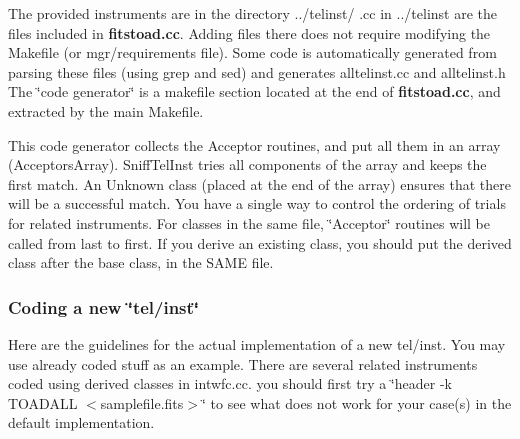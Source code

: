 The provided instruments are in the directory ../telinst/  .cc in ../telinst are the files included in {\bf fitstoad.cc}. Adding files there does not require modifying the Makefile (or mgr/requirements file). Some code is automatically generated from parsing these files (using grep and sed) and generates alltelinst.cc and alltelinst.h The \char`\"{}code generator\char`\"{} is a makefile section located at the end of {\bf fitstoad.cc}, and extracted by the main Makefile.

This code generator collects the Acceptor routines, and put all them in an array (Acceptors\-Array). Sniff\-Tel\-Inst tries all components of the array and keeps the first match. An Unknown class (placed at the end of the array) ensures that there will be a successful match.  You have a single way to control the ordering of trials for related instruments. For classes in the same file, \char`\"{}Acceptor\char`\"{} routines will be called from last to first. If you derive an existing class, you should put the derived class after the base class, in the SAME file.

\subsubsection{Coding a new \char`\"{}tel/inst\char`\"{}}\label{newtelinst}
 Here are the guidelines for the actual implementation of a new tel/inst. You may use already coded stuff as an example. There are several related instruments coded using derived classes  in intwfc.cc. you should first try a \char`\"{}header -k TOADALL $<$samplefile.fits$>$\char`\"{} to see what does not work for your case(s) in the default implementation.

